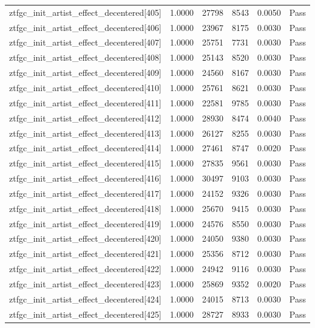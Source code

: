 \begin{table}[htbp]
\begin{tabular}{llrrll}
ztfgc\_init\_artist\_effect\_decentered[405] & 1.0000 & 27798 & 8543 & 0.0050 & Pass \\
ztfgc\_init\_artist\_effect\_decentered[406] & 1.0000 & 23967 & 8175 & 0.0030 & Pass \\
ztfgc\_init\_artist\_effect\_decentered[407] & 1.0000 & 25751 & 7731 & 0.0030 & Pass \\
ztfgc\_init\_artist\_effect\_decentered[408] & 1.0000 & 25143 & 8520 & 0.0030 & Pass \\
ztfgc\_init\_artist\_effect\_decentered[409] & 1.0000 & 24560 & 8167 & 0.0030 & Pass \\
ztfgc\_init\_artist\_effect\_decentered[410] & 1.0000 & 25761 & 8621 & 0.0030 & Pass \\
ztfgc\_init\_artist\_effect\_decentered[411] & 1.0000 & 22581 & 9785 & 0.0030 & Pass \\
ztfgc\_init\_artist\_effect\_decentered[412] & 1.0000 & 28930 & 8474 & 0.0040 & Pass \\
ztfgc\_init\_artist\_effect\_decentered[413] & 1.0000 & 26127 & 8255 & 0.0030 & Pass \\
ztfgc\_init\_artist\_effect\_decentered[414] & 1.0000 & 27461 & 8747 & 0.0020 & Pass \\
ztfgc\_init\_artist\_effect\_decentered[415] & 1.0000 & 27835 & 9561 & 0.0030 & Pass \\
ztfgc\_init\_artist\_effect\_decentered[416] & 1.0000 & 30497 & 9103 & 0.0030 & Pass \\
ztfgc\_init\_artist\_effect\_decentered[417] & 1.0000 & 24152 & 9326 & 0.0030 & Pass \\
ztfgc\_init\_artist\_effect\_decentered[418] & 1.0000 & 25670 & 9415 & 0.0030 & Pass \\
ztfgc\_init\_artist\_effect\_decentered[419] & 1.0000 & 24576 & 8550 & 0.0030 & Pass \\
ztfgc\_init\_artist\_effect\_decentered[420] & 1.0000 & 24050 & 9380 & 0.0030 & Pass \\
ztfgc\_init\_artist\_effect\_decentered[421] & 1.0000 & 25356 & 8712 & 0.0030 & Pass \\
ztfgc\_init\_artist\_effect\_decentered[422] & 1.0000 & 24942 & 9116 & 0.0030 & Pass \\
ztfgc\_init\_artist\_effect\_decentered[423] & 1.0000 & 25869 & 9352 & 0.0020 & Pass \\
ztfgc\_init\_artist\_effect\_decentered[424] & 1.0000 & 24015 & 8713 & 0.0030 & Pass \\
ztfgc\_init\_artist\_effect\_decentered[425] & 1.0000 & 28727 & 8933 & 0.0030 & Pass \\

\end{tabular}
\end{table}
